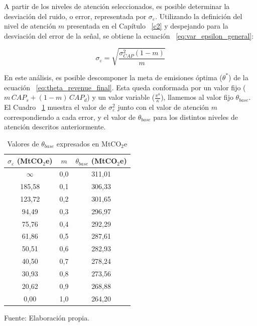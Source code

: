 A partir de los niveles de atención seleccionados, es posible determinar la desviación del ruido, o error, representada por $\sigma_{\varepsilon}$. Utilizando la definición del nivel de atención $m$ presentada en el Capítulo ~\ref{c2} y despejando para la desviación del error de la señal, se obtiene la ecuación ~\ref{eq:var_epsilon_general}:

\begin{equation}
\sigma_{\varepsilon} 
= \sqrt{\frac{\sigma_{CAP}^2(1-m)}{m}}
\label{eq:var_epsilon_general}
\end{equation}


En este análisis, es posible descomponer la meta de emisiones óptima ($\theta^*$) de la ecuación  ~\ref{eq:theta_revenue_final}. Esta queda conformada por un valor fijo ($m\,CAP_s + (1-m)\,CAP_d$) y un valor variable ($\frac{\pi^a}{\kappa}$), llamemos al valor fijo $\theta_{base}$. El Cuadro ~\ref{tab:theta_m} muestra el valor de $\sigma_{\varepsilon}^2$ junto con el valor de atención $m$ correspondiendo a cada error, y el valor de $\theta_{base}$ para los distintos niveles de atención descritos anteriormente.

\begin{table}[H]
\centering
\caption{Valores de $\theta_{base}$ expresados en MtCO$_2$e}
\label{tab:theta_m}
\renewcommand{\arraystretch}{1.2}
\setlength{\tabcolsep}{12pt}
\begin{tabular}{c c c}
\toprule
\textbf{$\sigma_{\varepsilon}$ (MtCO$_2$e)} & \textbf{$m$} & \textbf{$\theta_{base}$ (MtCO$_2$e)} \\
\midrule
$\infty$ & 0,0 & 311,01 \\
185,58 & 0,1 & 306,33 \\
123,72 & 0,2 & 301,65 \\
94,49  & 0,3 & 296,97 \\
75,76  & 0,4 & 292,29 \\
61,86  & 0,5 & 287,61 \\
50,51  & 0,6 & 282,93 \\
40,50  & 0,7 & 278,24 \\
30,93  & 0,8 & 273,56 \\
20,62  & 0,9 & 268,88 \\
0,00   & 1,0 & 264,20 \\
\bottomrule
\end{tabular}

\vspace{0.1cm}
\footnotesize{Fuente: Elaboración propia.}
\end{table}

